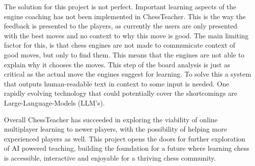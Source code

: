 The solution for this project is not perfect.
Important learning aspects of the engine coaching has not been implemented in ChessTeacher.
This is the way the feedback is presented to the players, as currently the users are only presented with the best moves
and no context to why this move is good.
The main limiting factor for this, is that chess engines are not made to communicate context of good moves, but only to
find them.
This means that the engines are not able to explain why it chooses the moves.
This step of the board analysis is just as critical as the actual move the engines suggest for learning.
To solve this a system that outputs human-readable text in context to some input is needed.
One rapidly evolving technology that could potentially cover the shortcomings are Large-Language-Models (LLM's).

Overall ChessTeacher has succeeded in exploring the viability of online multiplayer learning to newer players,
with the possibility of helping more experienced players as well.
This project opens the doors for further exploration of AI powered teaching, building the foundation for a future
where learning chess is accessible, interactive and enjoyable for a thriving chess community.
